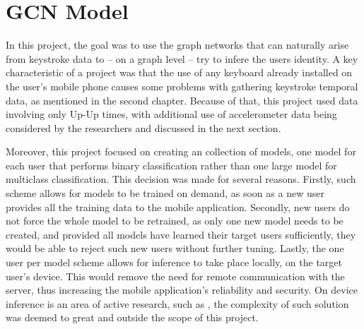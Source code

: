 \chapter{GCN Model}

In this project, the goal was to use the graph networks that can naturally arise from keystroke data to -- on a graph level -- try to infere the users identity. A key characteristic of a project was that the use of any keyboard already installed on the user's mobile phone causes some problems with gathering keystroke temporal data, as mentioned in the second chapter. Because of that, this project used data involving only Up-Up times, with additional use of accelerometer data being considered by the researchers and discussed in the next section. 

Moreover, this project focused on creating an collection of models, one model for each user that performs binary classification rather than one large model for multiclass classification. 
This decision was made for several reasons. Firstly, such scheme allows for models to be trained on demand, as soon as a new user provides all the training data to the mobile application. Secondly, new users do not force the whole model to be retrained, 
as only one new model needs to be created, and provided all models have learned their target users sufficiently, they would be able to reject such new users without further tuning. Lastly, the one user per model scheme allows for inference to take place locally, on the target user's device. This would remove the need for remote communication with the server, thus increasing the mobile application's reliability and security. On device inference is an area of active research, such as , the complexity of such solution was deemed to great and outside the scope of this project.
